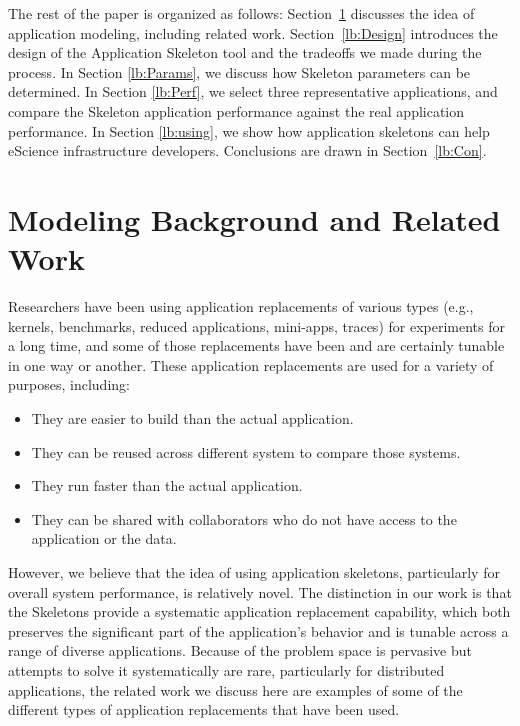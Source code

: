 \documentclass[preprint,12pt]{elsarticle}
\newcommand{\katznote}[1]{ {\textcolor{blue}    { ***Dan:   #1 }}}
\newcommand{\katznote}[1]{}
\begin{document}
The rest of the paper is organized as follows: 
Section~\ref{lb:RFwork} discusses the idea of application modeling, including related work.
Section~\ref{lb:Design} introduces the design of the Application Skeleton tool and the tradeoffs we made during the process.
In Section \ref{lb:Params}, we discuss how Skeleton parameters can be determined.
In Section \ref{lb:Perf}, we select three representative applications, and compare the Skeleton application performance against the real application performance. In Section \ref{lb:using}, we show how application skeletons can help eScience infrastructure developers.
Conclusions are drawn in Section~\ref{lb:Con}. 


\section{Modeling Background and Related Work}\label{lb:RFwork}

Researchers have been using application replacements of various types (e.g.,
kernels, benchmarks, reduced applications, mini-apps, traces) for experiments for a long
time, and some of those replacements have been and are certainly tunable in one
way or another. These application replacements are used for a variety of
purposes, including: %
\begin{itemize}
\item They are easier to build than the actual application.
\item They can be reused across different system to compare those systems.
\item They run faster than the actual application.
\item They can be shared with collaborators who do not have access to the application or the data. 
\end{itemize}

However, we believe that the idea of using application skeletons, particularly
for overall system performance, is relatively novel.  The distinction in our
work is that the Skeletons provide a systematic application replacement 
capability, which both preserves
the significant part of the application's behavior
and is tunable across a range of diverse
applications. Because of the problem space
is pervasive but attempts to solve it systematically are rare, particularly for
distributed applications, the related work we discuss here are examples of some
of the different types of application replacements that have been used. 
\end{document}
